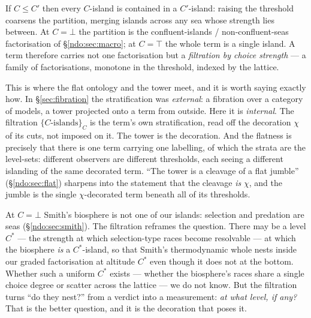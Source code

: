 \begin{proposition}\label{ndo:prop:filtration}
If $C \le C'$ then every $C$-island is contained in a $C'$-island: raising the threshold coarsens
the partition, merging islands across any sea whose strength lies between. At $C = \bot$ the
partition is the confluent-islands / non-confluent-seas factorisation of \S\ref{ndo:sec:macro}; at
$C = \top$ the whole term is a single island. A term therefore carries not one factorisation but a
\emph{filtration by choice strength} --- a family of factorisations, monotone in the threshold,
indexed by the lattice.
\end{proposition}

This is where the flat ontology and the tower meet, and it is worth saying exactly how. In
\S\ref{sec:fibration} the stratification was \emph{external}: a fibration over a category of models,
a tower projected onto a term from outside. Here it is \emph{internal}. The filtration
$\{C\text{-islands}\}_{C}$ is the term's own stratification, read off the decoration $\chi$ of its
cuts, not imposed on it. The tower is the decoration. And the flatness is precisely that there is
one term carrying one labelling, of which the strata are the level-sets: different observers are
different thresholds, each seeing a different islanding of the same decorated term. ``The tower is a
cleavage of a flat jumble'' (\S\ref{ndo:sec:flat}) sharpens into the statement that the cleavage
\emph{is} $\chi$, and the jumble is the single $\chi$-decorated term beneath all of its thresholds.

\begin{remark}\label{ndo:rmk:nest}
At $C = \bot$ Smith's biosphere is not one of our islands: selection and predation are seas
(\S\ref{ndo:sec:smith}). The filtration reframes the question. There may be a level $C^{*}$ --- the
strength at which selection-type races become resolvable --- at which the biosphere \emph{is} a
$C^{*}$-island, so that Smith's thermodynamic whole nests inside our graded factorisation at
altitude $C^{*}$ even though it does not at the bottom. Whether such a uniform $C^{*}$ exists ---
whether the biosphere's races share a single choice degree or scatter across the lattice --- we do
not know. But the filtration turns ``do they nest?'' from a verdict into a measurement: \emph{at
what level, if any?} That is the better question, and it is the decoration that poses it.
\end{remark}

